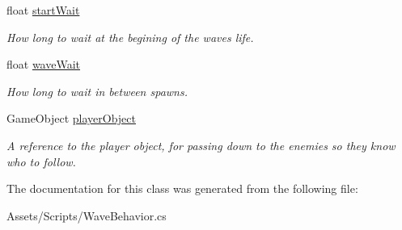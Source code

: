\begin{DoxyCompactItemize}
\mbox{\label{class_wave_behavior_ae8cd1f5cb102b67698fd4043bf2314d2}} 
float \mbox{\hyperlink{class_wave_behavior_ae8cd1f5cb102b67698fd4043bf2314d2}{start\+Wait}}
\begin{DoxyCompactList}\small\item\em How long to wait at the begining of the wave\textquotesingle{}s life. \end{DoxyCompactList}\item 
\mbox{\label{class_wave_behavior_a3f40e6d29cd2c0814506f93d19c10f2b}} 
float \mbox{\hyperlink{class_wave_behavior_a3f40e6d29cd2c0814506f93d19c10f2b}{wave\+Wait}}
\begin{DoxyCompactList}\small\item\em How long to wait in between spawns. \end{DoxyCompactList}\item 
\mbox{\label{class_wave_behavior_a97c0d24bc7af3d86d245206339a04d1f}} 
Game\+Object \mbox{\hyperlink{class_wave_behavior_a97c0d24bc7af3d86d245206339a04d1f}{player\+Object}}
\begin{DoxyCompactList}\small\item\em A reference to the player object, for passing down to the enemies so they know who to follow. \end{DoxyCompactList}\end{DoxyCompactItemize}


The documentation for this class was generated from the following file\+:\begin{DoxyCompactItemize}
\item 
Assets/\+Scripts/Wave\+Behavior.\+cs\end{DoxyCompactItemize}
